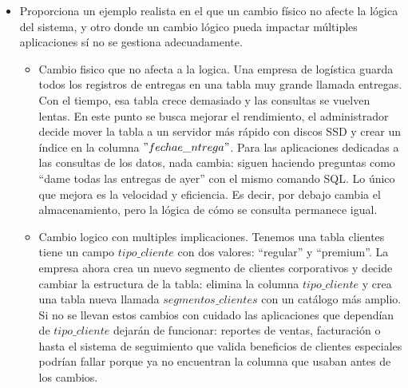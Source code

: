 \documentclass[12pt]{report}
\begin{document}
\begin{enumerate}[label=\textbf{\arabic*.}, leftmargin=*]
\begin{enumerate}[label=\textbf{\alph*.}, leftmargin=*, itemsep=1.0em]
\begin{itemize}
  \item Proporciona un ejemplo realista en el que un cambio f\'isico no afecte la l\'ogica del sistema, y otro donde un cambio l\'ogico pueda impactar m\'ultiples aplicaciones s\'i no se gestiona adecuadamente.\\


         \begin{itemize}

             \item Cambio fisico que no afecta a la logica.
               Una empresa de logística guarda todos los registros de entregas en una tabla muy grande llamada entregas. Con el tiempo, esa tabla crece demasiado y las consultas se vuelven lentas. En este punto se busca mejorar el rendimiento, el administrador decide mover la tabla a un servidor más rápido con discos SSD y crear un índice en la columna $"fechae\_ntrega"$.
                Para las aplicaciones dedicadas a las consultas de los datos, nada cambia: siguen haciendo preguntas como “dame todas las entregas de ayer” con el mismo comando SQL. Lo único que mejora es la velocidad y eficiencia. Es decir, por debajo cambia el almacenamiento, pero la lógica de cómo se consulta permanece igual.

             \item Cambio logico con multiples implicaciones.
                Tenemos una tabla clientes tiene un campo $tipo\_cliente$ con dos valores: “regular” y “premium”. La empresa ahora crea un nuevo segmento de clientes corporativos y decide cambiar la estructura de la tabla: elimina la columna $tipo\_cliente$ y crea una tabla nueva llamada $segmentos\_clientes$ con un catálogo más amplio.
                  Si no se llevan estos cambios con cuidado las aplicaciones que dependían de $tipo\_cliente$ dejarán de funcionar: reportes de ventas, facturación o hasta el sistema de seguimiento que valida beneficios de clientes especiales podrían fallar porque ya no encuentran la columna que usaban antes de los cambios.
         \end{itemize}

\end{itemize}





\end{enumerate}
\end{enumerate}
\end{document}
